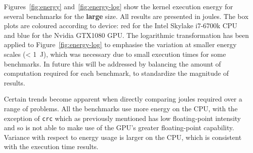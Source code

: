 \documentclass[../document.tex]{subfiles}
\begin{document}

Figures~\ref{fig:energy} and~\ref{fig:energy-log} show the kernel execution energy for several benchmarks for the {\bf large} size.
All results are presented in joules.
The box plots are coloured according to device: red for the Intel Skylake i7-6700k CPU and blue for the Nvidia GTX1080 GPU.
The logarithmic transformation has been applied to Figure~\ref{fig:energy-log} to emphasise the variation at smaller energy scales (< \SI{1}{\joule}), which was necessary due to small execution times for some benchmarks.
In future this will be addressed by balancing the amount of computation required for each benchmark, to standardize the magnitude of results.

Certain trends become apparent when directly comparing joules required over a range of problems.
All the benchmarks use more energy on the CPU, with the exception of {\tt crc} which as previously mentioned has low floating-point intensity and so is not able to make use of the GPU's greater floating-point capability. 
Variance with respect to energy usage is larger on the CPU, which is consistent with the execution time results.
\end{document}
